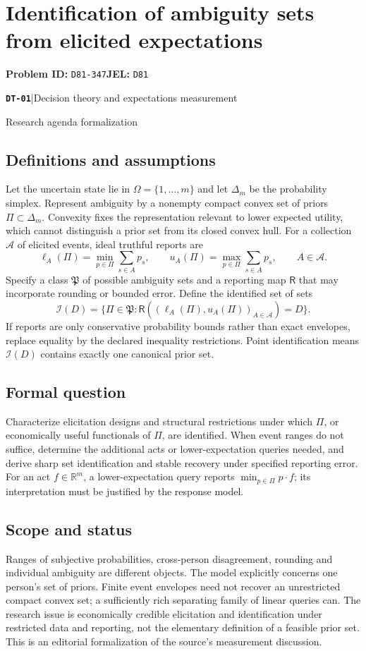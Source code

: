 \documentclass[11pt,a4paper]{article}
\newcommand{\R}{\mathbb R}
\newcommand{\entrymeta}[3]{{\sffamily\small\color{muted}\textbf{\texttt{#1}}\quad|\quad #2\par #3\par}}
\begin{document}
\section*{Identification of ambiguity sets from elicited expectations}
\textbf{Problem ID:} \texttt{D81-347}\quad \textbf{JEL:} \texttt{D81}\par
\label{problem:OP-0586}
\label{beyond:DT-01}
\entrymeta{DT-01}{Decision theory and expectations measurement}{Research agenda formalization}
\subsection*{Definitions and assumptions}
Let the uncertain state lie in $\Omega=\{1,\ldots,m\}$ and let $\Delta_m$ be the probability simplex. Represent ambiguity by a nonempty compact convex set of priors $\Pi\subset\Delta_m$. Convexity fixes the representation relevant to lower expected utility, which cannot distinguish a prior set from its closed convex hull. For a collection $\mathcal A$ of elicited events, ideal truthful reports are
\[
 \ell_A(\Pi)=\min_{p\in\Pi}\sum_{s\in A}p_s,\qquad
 u_A(\Pi)=\max_{p\in\Pi}\sum_{s\in A}p_s,\qquad A\in\mathcal A.
\]
Specify a class $\mathfrak P$ of possible ambiguity sets and a reporting map $\mathsf R$ that may incorporate rounding or bounded error. Define the identified set of sets
\[
 \mathcal I(D)=\{\Pi\in\mathfrak P:\mathsf R((\ell_A(\Pi),u_A(\Pi))_{A\in\mathcal A})=D\}.
\]
If reports are only conservative probability bounds rather than exact envelopes, replace equality by the declared inequality restrictions. Point identification means $\mathcal I(D)$ contains exactly one canonical prior set.
\subsection*{Formal question}
Characterize elicitation designs and structural restrictions under which $\Pi$, or economically useful functionals of $\Pi$, are identified. When event ranges do not suffice, determine the additional acts or lower-expectation queries needed, and derive sharp set identification and stable recovery under specified reporting error. For an act $f\in\R^m$, a lower-expectation query reports $\min_{p\in\Pi}p\cdot f$; its interpretation must be justified by the response model.
\subsection*{Scope and status}
Ranges of subjective probabilities, cross-person disagreement, rounding and individual ambiguity are different objects. The model explicitly concerns one person's set of priors. Finite event envelopes need not recover an unrestricted compact convex set; a sufficiently rich separating family of linear queries can. The research issue is economically credible elicitation and identification under restricted data and reporting, not the elementary definition of a feasible prior set. This is an editorial formalization of the source's measurement discussion.
\end{document}
